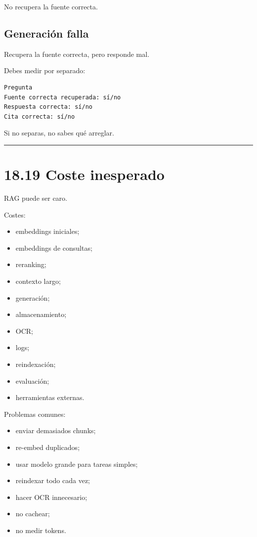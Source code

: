 No recupera la fuente correcta.

\subsection{Generación falla}\label{generaciuxf3n-falla}

Recupera la fuente correcta, pero responde mal.

Debes medir por separado:

\begin{lstlisting}
Pregunta
Fuente correcta recuperada: sí/no
Respuesta correcta: sí/no
Cita correcta: sí/no
\end{lstlisting}

Si no separas, no sabes qué arreglar.

\begin{center}\rule{0.5\linewidth}{0.5pt}\end{center}

\section{18.19 Coste inesperado}\label{coste-inesperado}

RAG puede ser caro.

Costes:

\begin{itemize}
\tightlist
\item
  embeddings iniciales;
\item
  embeddings de consultas;
\item
  reranking;
\item
  contexto largo;
\item
  generación;
\item
  almacenamiento;
\item
  OCR;
\item
  logs;
\item
  reindexación;
\item
  evaluación;
\item
  herramientas externas.
\end{itemize}

Problemas comunes:

\begin{itemize}
\tightlist
\item
  enviar demasiados chunks;
\item
  re-embed duplicados;
\item
  usar modelo grande para tareas simples;
\item
  reindexar todo cada vez;
\item
  hacer OCR innecesario;
\item
  no cachear;
\item
  no medir tokens.
\end{itemize}

